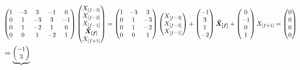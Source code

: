 {\scriptsize \begin{equation}
\hspace{-0.0cm}
\begin{split}
&\begin{pmatrix}
1 &-3 &3 &-1&0\\
0 &1 &-3 &3 &-1\\
0 &1 &-2 &1 &0\\
0 &0 &1 &-2 &1\\
\end{pmatrix}
\begin{pmatrix}
X_{[f-3]}\\
X_{[f-2]}\\
X_{[f-1]}\\
\boldsymbol{\tilde{X}_{[f]}}\\
X_{[f+1]}\\
\end{pmatrix} = 
\begin{pmatrix}
1 &-3 &3\\
0 &1 &-3\\
0 &1 &-2\\
0 &0 &1\\
\end{pmatrix}
\begin{pmatrix}
X_{[f-3]}\\
X_{[f-2]}\\
X_{[f-1]}\\
\end{pmatrix}+
\begin{pmatrix}
-1\\
3\\
1\\
-2\\
\end{pmatrix}
\boldsymbol{\tilde{X}_{[f]}}+
\begin{pmatrix}
0\\
-1\\
0\\
1\\
\end{pmatrix}
X_{[f+1]} = 
\begin{pmatrix}
0\\
0\\
0\\
0\\
\end{pmatrix} \\
&\Rightarrow
\underbrace{
\begin{pmatrix}
-1\\
3\\

\end{pmatrix}}
\end{split}
\end{equation}}
